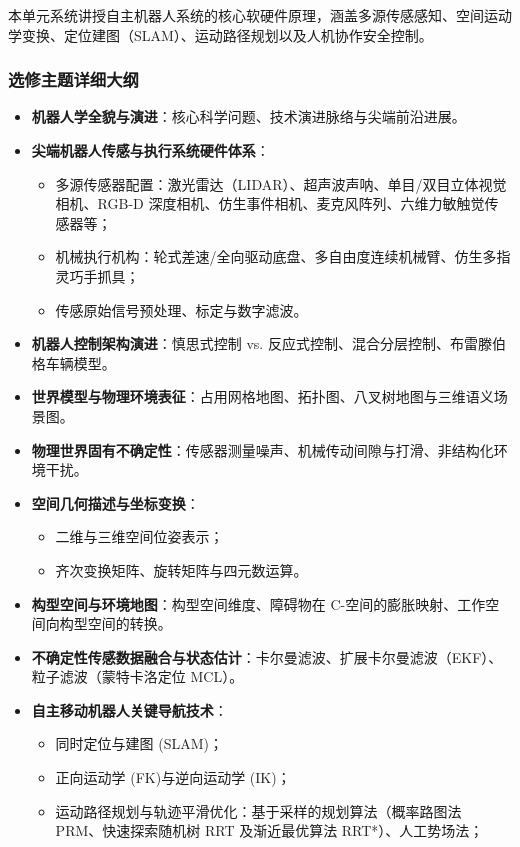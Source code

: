 本单元系统讲授自主机器人系统的核心软硬件原理，涵盖多源传感感知、空间运动学变换、定位建图（SLAM）、运动路径规划以及人机协作安全控制。

\subsubsection{选修主题详细大纲}
\begin{itemize}
    \item \textbf{机器人学全貌与演进}：核心科学问题、技术演进脉络与尖端前沿进展。
    \item \textbf{尖端机器人传感与执行系统硬件体系}：
    \begin{itemize}
        \item 多源传感器配置：激光雷达（LIDAR）、超声波声呐、单目/双目立体视觉相机、RGB-D 深度相机、仿生事件相机、麦克风阵列、六维力敏触觉传感器等；
        \item 机械执行机构：轮式差速/全向驱动底盘、多自由度连续机械臂、仿生多指灵巧手抓具；
        \item 传感原始信号预处理、标定与数字滤波。
    \end{itemize}
    \item \textbf{机器人控制架构演进}：慎思式控制 vs. 反应式控制、混合分层控制、布雷滕伯格车辆模型。
    \item \textbf{世界模型与物理环境表征}：占用网格地图、拓扑图、八叉树地图与三维语义场景图。
    \item \textbf{物理世界固有不确定性}：传感器测量噪声、机械传动间隙与打滑、非结构化环境干扰。
    \item \textbf{空间几何描述与坐标变换}：
    \begin{itemize}
        \item 二维与三维空间位姿表示；
        \item 齐次变换矩阵、旋转矩阵与四元数运算。
    \end{itemize}
    \item \textbf{构型空间与环境地图}：构型空间维度、障碍物在 C-空间的膨胀映射、工作空间向构型空间的转换。
    \item \textbf{不确定性传感数据融合与状态估计}：卡尔曼滤波、扩展卡尔曼滤波（EKF）、粒子滤波（蒙特卡洛定位 MCL）。
    \item \textbf{自主移动机器人关键导航技术}：
    \begin{itemize}
        \item 同时定位与建图 (SLAM)；
        \item 正向运动学 (FK)与逆向运动学 (IK)；
        \item 运动路径规划与轨迹平滑优化：基于采样的规划算法（概率路图法 PRM、快速探索随机树 RRT 及渐近最优算法 RRT*）、人工势场法；

\end{itemize}
\end{itemize}
